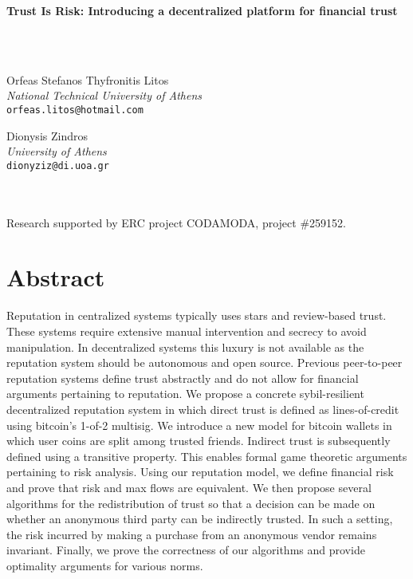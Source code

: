 \documentclass[11pt]{article}
\theoremstyle{definition}
\theoremstyle{corollary}
\theoremstyle{lemma}
\begin{document}
  \begin{centering}
     \Large{\textbf{Trust Is Risk: Introducing a decentralized platform for financial trust}}
  \end{centering}
  \ \\ \ \\
  \hspace*{\fill}
  \begin{minipage}[t]{7cm}
     \begin{flushleft}
        Orfeas Stefanos Thyfronitis Litos \\
        \textit{National Technical University of Athens} \\
        \texttt{orfeas.litos@hotmail.com}
     \end{flushleft}
  \end{minipage}
  \hfill
  \begin{minipage}[t]{7cm}
     \begin{flushright}
        Dionysis Zindros \textdagger \\
        \textit{University of Athens} \\
        \texttt{dionyziz@di.uoa.gr}
     \end{flushright}
  \end{minipage}
  \hspace*{\fill} \\ \ \\
  \textdagger Research supported by ERC project CODAMODA, project \#259152.

  \section{Abstract}
  Reputation in centralized systems typically uses stars and review-based
  trust. These systems require extensive manual intervention and secrecy to
  avoid manipulation. In decentralized systems this luxury is not available
  as the reputation system should be autonomous and open source. Previous
  peer-to-peer reputation systems define trust abstractly and do not allow for
  financial arguments pertaining to reputation. We propose a concrete
  sybil-resilient decentralized reputation system in which direct trust is
  defined as lines-of-credit using bitcoin's 1-of-2 multisig. We introduce a new
  model for bitcoin wallets in which user coins are split among trusted friends.
  Indirect trust is subsequently defined using a transitive property. This
  enables formal game theoretic arguments pertaining to risk analysis. Using our
  reputation model, we define financial risk and prove that risk and max flows
  are equivalent. We then propose several algorithms for the redistribution of
  trust so that a decision can be made on whether an anonymous third party can
  be indirectly trusted. In such a setting, the risk incurred by making a
  purchase from an anonymous vendor remains invariant. Finally, we prove the
  correctness of our algorithms and provide optimality arguments for various
  norms.
\end{document}
